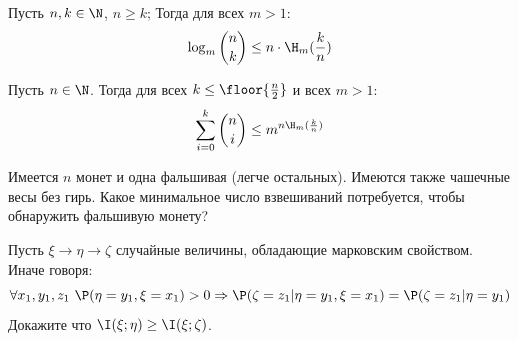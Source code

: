 \documentclass[seminar, recordsfile={../records.lua}]{practice}
\begin{document}
\begin{exercise}
	Пусть $n, k \in \N$, $n \geq k$; Тогда для всех $m > 1$:
	\[
		\log_m\binom{n}{k} \leq n \cdot \H_m(\frac{k}{n})
	\]
\end{exercise}
\begin{exercise}
	Пусть $n \in \N$. Тогда для всех $k \leq \floor{\frac{n}{2}}$ и всех $m > 1$:
	\[
		\sum_{i = 0}^{k}\binom{n}{i} \leq m^{n\H_m(\frac{k}{n})}
	\]
\end{exercise}
\begin{exercise}
	Имеется $n$ монет и одна фальшивая (легче остальных). Имеются также чашечные весы без гирь. Какое минимальное число	взвешиваний потребуется, чтобы обнаружить фальшивую монету?
\end{exercise}
\begin{exercise}
	Пусть $\xi \to \eta \to \zeta$ случайные величины, обладающие марковским свойством. Иначе говоря:
	$$
		\forall x_1, y_1, z_1 \ \P(\eta = y_1, \xi = x_1) > 0 \Rightarrow \P(\zeta = z_1 | \eta = y_1, \xi = x_1) = \P(\zeta = z_1 | \eta = y_1)
	$$
	Докажите что $\I(\xi; \eta) \geq \I(\xi; \zeta)$.
\end{exercise}



\end{document}
